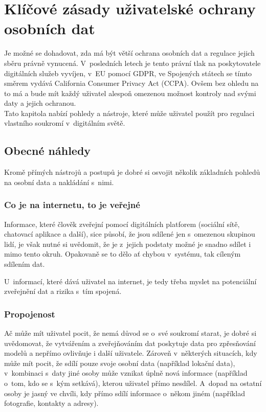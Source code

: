 \chapter{Klíčové zásady uživatelské ochrany osobních dat}

Je možné se dohadovat, zda má být větší ochrana osobních dat a regulace jejich sběru právně vynucená. V~posledních letech je tento právní tlak na poskytovatele digitálních služeb vyvíjen, v~EU pomocí GDPR, ve Spojených státech se tímto směrem vydává California Consumer Privacy Act (CCPA).
Ovšem bez ohledu na to má a bude mít každý uživatel alespoň omezenou možnost kontroly nad svými daty a jejich ochranou.\\
Tato kapitola nabízí pohledy a nástroje, které může uživatel použít pro regulaci vlastního soukromí v~digitálním světě.

\section{Obecné náhledy}
Kromě přímých nástrojů a postupů je dobré si osvojit několik základních pohledů na osobní data a nakládání s~nimi.

\subsection{Co je na internetu, to je veřejné}
Informace, které člověk zveřejní pomocí digitálních platforem (sociální sítě, chatovací aplikace a další), sice působí, že jsou sdílené jen s~omezenou skupinou lidí, je však nutné si uvědomit, že je z~jejich podstaty možné je snadno sdílet i mimo tento okruh. Opakovaně se to dělo ať chybou v~systému, tak cíleným sdílením dat.

U~informací, které dává uživatel na internet, je tedy třeba myslet na potenciální zveřejnění dat a rizika s~tím spojená.


\subsection{Propojenost}
Ač může mít uživatel pocit, že nemá důvod se o~své soukromí starat, je dobré si uvědomovat, že vytvářením a zveřejňováním dat poskytuje data pro zpřesňování modelů a nepřímo ovlivňuje i další uživatele. Zároveň v~některých situacích, kdy může mít pocit, že sdílí pouze svoje osobní data (například lokační data), v~kombinaci s~daty jiné osoby může vznikat úplně nová informace (například o~tom, kdo se s~kým setkává), kterou uživatel přímo nesdílel. A~dopad na ostatní osoby je jasný ve chvíli, kdy přímo sdílí informace o~někom jiném (například fotografie, kontakty a adresy).  


